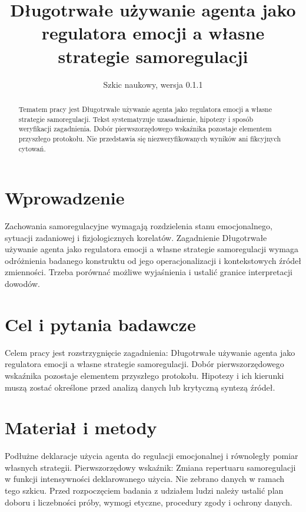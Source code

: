 \documentclass[11pt,a4paper]{article}
\title{Długotrwałe używanie agenta jako regulatora emocji a własne strategie samoregulacji}
\author{}
\date{Szkic naukowy, wersja 0.1.1}
\begin{document}
\maketitle

\begin{abstract}

Tematem pracy jest Długotrwałe używanie agenta jako regulatora emocji a własne strategie samoregulacji. Tekst systematyzuje uzasadnienie, hipotezy i sposób weryfikacji zagadnienia. Dobór pierwszorzędowego wskaźnika pozostaje elementem przyszłego protokołu. Nie przedstawia się niezweryfikowanych wyników ani fikcyjnych cytowań.

\end{abstract}

\section{Wprowadzenie}

Zachowania samoregulacyjne wymagają rozdzielenia stanu emocjonalnego, sytuacji zadaniowej i fizjologicznych korelatów. Zagadnienie Długotrwałe używanie agenta jako regulatora emocji a własne strategie samoregulacji wymaga odróżnienia badanego konstruktu od jego operacjonalizacji i kontekstowych źródeł zmienności. Trzeba porównać możliwe wyjaśnienia i ustalić granice interpretacji dowodów.

\section{Cel i pytania badawcze}

Celem pracy jest rozstrzygnięcie zagadnienia: Długotrwałe używanie agenta jako regulatora emocji a własne strategie samoregulacji. Dobór pierwszorzędowego wskaźnika pozostaje elementem przyszłego protokołu. Hipotezy i ich kierunki muszą zostać określone przed analizą danych lub krytyczną syntezą źródeł.

\section{Materiał i metody}

Podłużne deklaracje użycia agenta do regulacji emocjonalnej i równoległy pomiar własnych strategii. Pierwszorzędowy wskaźnik: Zmiana repertuaru samoregulacji w funkcji intensywności deklarowanego użycia. Nie zebrano danych w ramach tego szkicu. Przed rozpoczęciem badania z udziałem ludzi należy ustalić plan doboru i liczebności próby, wymogi etyczne, procedury zgody i ochrony danych.
\end{document}
